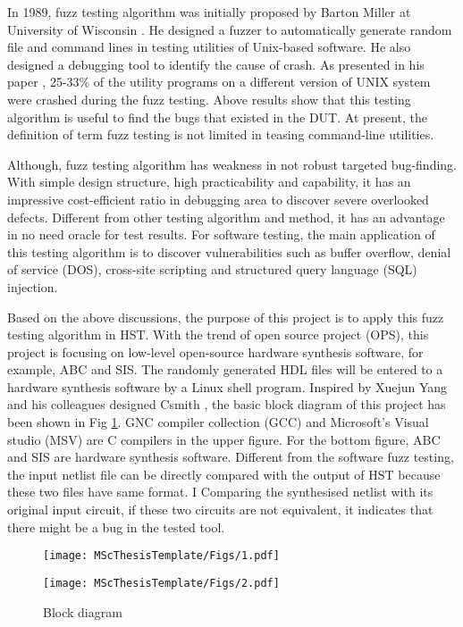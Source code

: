 In 1989, fuzz testing algorithm was initially proposed by Barton Miller at University of Wisconsin \cite{miller2007fuzz}. He designed a fuzzer to automatically generate random file and command lines in testing utilities of Unix-based software. He also designed a debugging tool to identify the cause of crash. As presented in his paper \cite{miller1990empirical}, 25-33\% of the utility programs on a different version of UNIX system were crashed during the fuzz testing. Above results show that this testing algorithm is useful to find the bugs that existed in the DUT. At present, the definition of term fuzz testing is not limited in teasing command-line utilities.

Although, fuzz testing algorithm has weakness in not robust targeted bug-finding. 
With simple design structure, high practicability and capability, it has an impressive cost-efficient ratio in debugging area to discover severe overlooked defects. Different from other testing algorithm and method, it has an advantage in no need oracle for test results. For software testing, the main application of this testing algorithm is to discover vulnerabilities such as buffer overflow,
denial of service (DOS), cross-site scripting and structured query language (SQL) injection\cite{Yang:2011:FUB:1993316.1993532}. 

Based on the above discussions, the purpose of this project is to apply this fuzz testing algorithm in HST. With the trend of open source project (OPS), this project is focusing on low-level open-source hardware synthesis software, for example, ABC and SIS. The randomly generated HDL files will be entered to a hardware synthesis software by a Linux shell program. Inspired by Xuejun Yang and his colleagues designed Csmith \cite{Yang:2011:FUB:1993316.1993532}, the basic block diagram of this project has been shown in Fig \ref{Fig:Block diagram}. GNC compiler collection (GCC) and Microsoft's Visual studio (MSV) are C compilers in the upper figure. For the bottom figure, ABC and SIS are hardware synthesis software. Different from the software fuzz testing, the input netlist file can be directly compared with the output of HST because these two files have same format. I Comparing the synthesised netlist with its original input circuit, if these two circuits are not equivalent, it indicates that there might be a bug in the tested tool. 


\begin{figure}[htb]
\centering
\begin{minipage}[htb]{1\textwidth}
\centering
\texttt{[image: MScThesisTemplate/Figs/1.pdf]}
\end{minipage}
\begin{minipage}[htb]{1\textwidth}
\centering
\texttt{[image: MScThesisTemplate/Figs/2.pdf]}
\end{minipage}
\caption{\footnotesize Block diagram}
\label{Fig:Block diagram}
\end{figure}

